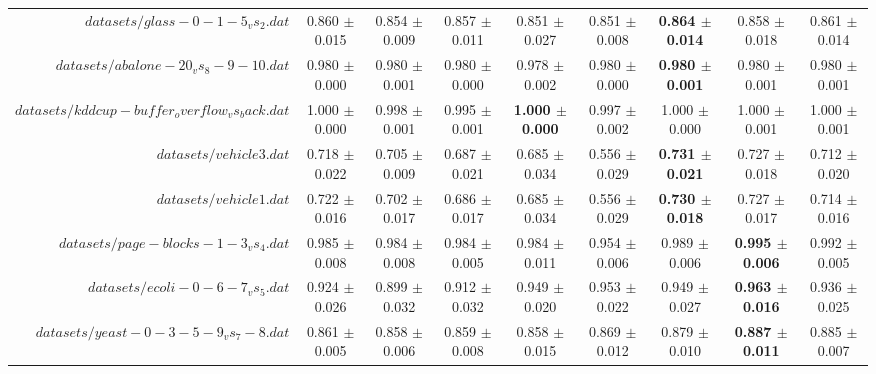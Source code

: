 \begin{table}[!ht]
{\begin{tabular}{r c c c c c c c c}
$datasets/glass-0-1-5_vs_2.dat$ & 0.860 $\pm$ 0.015 & 0.854 $\pm$ 0.009 & 0.857 $\pm$ 0.011 & 0.851 $\pm$ 0.027 & 0.851 $\pm$ 0.008 & \textbf{0.864 $\pm$ 0.014} & 0.858 $\pm$ 0.018 & 0.861 $\pm$ 0.014 \\
$datasets/abalone-20_vs_8-9-10.dat$ & 0.980 $\pm$ 0.000 & 0.980 $\pm$ 0.001 & 0.980 $\pm$ 0.000 & 0.978 $\pm$ 0.002 & 0.980 $\pm$ 0.000 & \textbf{0.980 $\pm$ 0.001} & 0.980 $\pm$ 0.001 & 0.980 $\pm$ 0.001 \\
$datasets/kddcup-buffer_overflow_vs_back.dat$ & 1.000 $\pm$ 0.000 & 0.998 $\pm$ 0.001 & 0.995 $\pm$ 0.001 & \textbf{1.000 $\pm$ 0.000} & 0.997 $\pm$ 0.002 & 1.000 $\pm$ 0.000 & 1.000 $\pm$ 0.001 & 1.000 $\pm$ 0.001 \\
$datasets/vehicle3.dat$ & 0.718 $\pm$ 0.022 & 0.705 $\pm$ 0.009 & 0.687 $\pm$ 0.021 & 0.685 $\pm$ 0.034 & 0.556 $\pm$ 0.029 & \textbf{0.731 $\pm$ 0.021} & 0.727 $\pm$ 0.018 & 0.712 $\pm$ 0.020 \\
$datasets/vehicle1.dat$ & 0.722 $\pm$ 0.016 & 0.702 $\pm$ 0.017 & 0.686 $\pm$ 0.017 & 0.685 $\pm$ 0.034 & 0.556 $\pm$ 0.029 & \textbf{0.730 $\pm$ 0.018} & 0.727 $\pm$ 0.017 & 0.714 $\pm$ 0.016 \\
$datasets/page-blocks-1-3_vs_4.dat$ & 0.985 $\pm$ 0.008 & 0.984 $\pm$ 0.008 & 0.984 $\pm$ 0.005 & 0.984 $\pm$ 0.011 & 0.954 $\pm$ 0.006 & 0.989 $\pm$ 0.006 & \textbf{0.995 $\pm$ 0.006} & 0.992 $\pm$ 0.005 \\
$datasets/ecoli-0-6-7_vs_5.dat$ & 0.924 $\pm$ 0.026 & 0.899 $\pm$ 0.032 & 0.912 $\pm$ 0.032 & 0.949 $\pm$ 0.020 & 0.953 $\pm$ 0.022 & 0.949 $\pm$ 0.027 & \textbf{0.963 $\pm$ 0.016} & 0.936 $\pm$ 0.025 \\
$datasets/yeast-0-3-5-9_vs_7-8.dat$ & 0.861 $\pm$ 0.005 & 0.858 $\pm$ 0.006 & 0.859 $\pm$ 0.008 & 0.858 $\pm$ 0.015 & 0.869 $\pm$ 0.012 & 0.879 $\pm$ 0.010 & \textbf{0.887 $\pm$ 0.011} & 0.885 $\pm$ 0.007 \\
\end{tabular}}
\end{table}
